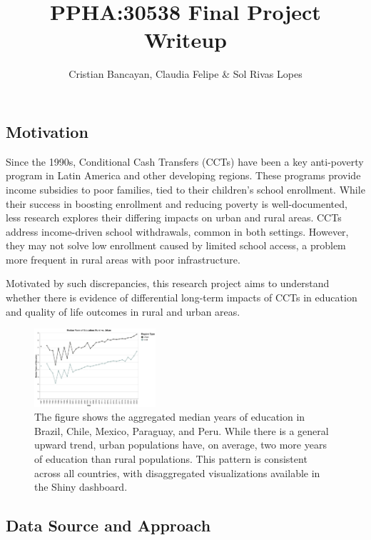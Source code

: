 \documentclass[
  10pt,
]{article}
\title{\large PPHA:30538 Final Project Writeup}
\author{\normalsize Cristian Bancayan, Claudia Felipe \& Sol Rivas
Lopes}
\date{}
\begin{document}
\maketitle


\subsection{Motivation}\label{motivation}

Since the 1990s, Conditional Cash Transfers (CCTs) have been a key
anti-poverty program in Latin America and other developing regions.
These programs provide income subsidies to poor families, tied to their
children's school enrollment. While their success in boosting enrollment
and reducing poverty is well-documented, less research explores their
differing impacts on urban and rural areas. CCTs address income-driven
school withdrawals, common in both settings. However, they may not solve
low enrollment caused by limited school access, a problem more frequent
in rural areas with poor infrastructure.

Motivated by such discrepancies, this research project aims to
understand whether there is evidence of differential long-term impacts
of CCTs in education and quality of life outcomes in rural and urban
areas.

\begin{figure}[H]

{\centering \includegraphics[width=0.4\textwidth,height=\textheight]{Graphs/years_edu_all.png}

}

\caption{The figure shows the aggregated median years of education in
Brazil, Chile, Mexico, Paraguay, and Peru. While there is a general
upward trend, urban populations have, on average, two more years of
education than rural populations. This pattern is consistent across all
countries, with disaggregated visualizations available in the Shiny
dashboard.}

\end{figure}%

\subsection{Data Source and Approach}\label{data-source-and-approach}
\end{document}
